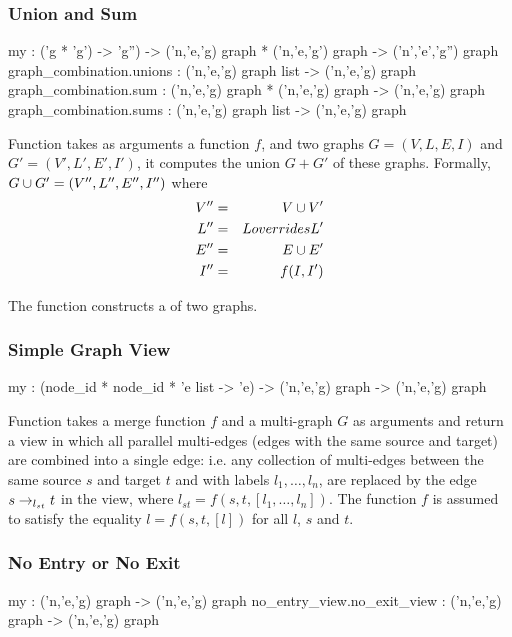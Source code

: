\subsubsection{Union and Sum}
\begin{SML}
   my  : ('g * 'g') -> 'g'') ->
      ('n,'e,'g) graph * ('n,'e,'g') graph -> ('n','e','g'') graph
   graph_combination.unions : ('n,'e,'g) graph list -> ('n,'e,'g) graph
   graph_combination.sum : ('n,'e,'g) graph * ('n,'e,'g) graph -> ('n,'e,'g) graph
   graph_combination.sums : ('n,'e,'g) graph list -> ('n,'e,'g) graph
\end{SML}

Function  takes as arguments
a function $f$, and two graphs
$G=(V,L,E,I)$ and $G'=(V',L',E',I')$, it computes the union $G+G'$ of
these graphs.  Formally, $G \cup G'=(V'',L'',E'',I'')$ where
\begin{eqnarray*}
   V'' & = & V \cup V' \\
   L'' & = & L overrides L' \\
   E'' & = & E \cup E' \\
   I'' & = & f(I,I')
\end{eqnarray*}

The function  constructs a  of two
graphs.
\subsubsection{Simple Graph View}
\begin{SML}
  my  : (node_id * node_id * 'e list -> 'e) ->
   ('n,'e,'g) graph -> ('n,'e,'g) graph
\end{SML}
  Function  takes a merge function $f$ 
  and a multi-graph $G$ as arguments and return a view in which
  all parallel multi-edges (edges with the same source and target) are combined
  into a single edge: i.e. any collection of multi-edges between
  the same source $s$ and target $t$ and with labels $l_1,\ldots,l_n$, 
  are replaced by the edge $s \rightarrow_{l_{st}} t$ in the view, where
  $l_{st} = f(s,t,[l_1,\ldots,l_n])$.  The function $f$ is assumed
  to satisfy the equality $l = f(s,t,[l])$ for all $l$, $s$ and $t$.

\subsubsection{No Entry or No Exit} 
\begin{SML}
  my  : ('n,'e,'g) graph -> ('n,'e,'g) graph
  no_entry_view.no_exit_view : ('n,'e,'g) graph -> ('n,'e,'g) graph
\end{SML}

